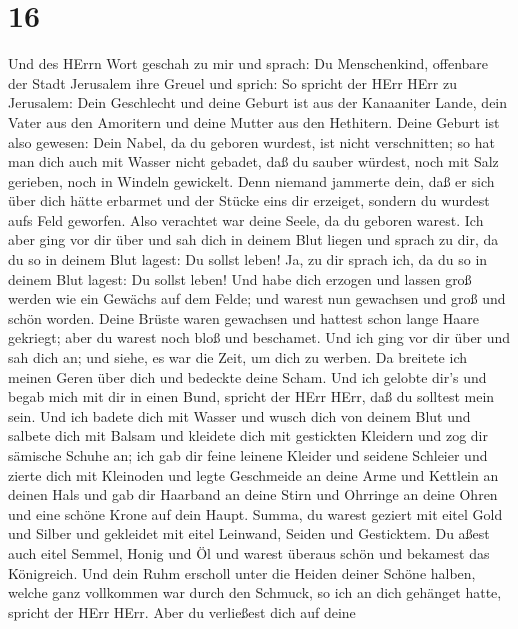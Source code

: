 \hypertarget{section-15}{%
\section{16}\label{section-15}}

 Und des HErrn Wort geschah zu mir und sprach: 
Du Menschenkind, offenbare der Stadt Jerusalem ihre Greuel und sprich:
 So spricht der HErr HErr zu Jerusalem: Dein Geschlecht und
deine Geburt ist aus der Kanaaniter Lande, dein Vater aus den Amoritern
und deine Mutter aus den Hethitern.  Deine Geburt ist also
gewesen: Dein Nabel, da du geboren wurdest, ist nicht verschnitten; so
hat man dich auch mit Wasser nicht gebadet, daß du sauber würdest, noch
mit Salz gerieben, noch in Windeln gewickelt.  Denn niemand
jammerte dein, daß er sich über dich hätte erbarmet und der Stücke eins
dir erzeiget, sondern du wurdest aufs Feld geworfen. Also verachtet war
deine Seele, da du geboren warest.  Ich aber ging vor dir
über und sah dich in deinem Blut liegen und sprach zu dir, da du so in
deinem Blut lagest: Du sollst leben! Ja, zu dir sprach ich, da du so in
deinem Blut lagest: Du sollst leben!  Und habe dich erzogen
und lassen groß werden wie ein Gewächs auf dem Felde; und warest nun
gewachsen und groß und schön worden. Deine Brüste waren gewachsen und
hattest schon lange Haare gekriegt; aber du warest noch bloß und
beschamet.  Und ich ging vor dir über und sah dich an; und
siehe, es war die Zeit, um dich zu werben. Da breitete ich meinen Geren
über dich und bedeckte deine Scham. Und ich gelobte dir's und begab mich
mit dir in einen Bund, spricht der HErr HErr, daß du solltest mein sein.
 Und ich badete dich mit Wasser und wusch dich von deinem
Blut und salbete dich mit Balsam  und kleidete dich mit
gestickten Kleidern und zog dir sämische Schuhe an; ich gab dir feine
leinene Kleider und seidene Schleier  und zierte dich mit
Kleinoden und legte Geschmeide an deine Arme und Kettlein an deinen Hals
 und gab dir Haarband an deine Stirn und Ohrringe an deine
Ohren und eine schöne Krone auf dein Haupt.  Summa, du
warest geziert mit eitel Gold und Silber und gekleidet mit eitel
Leinwand, Seiden und Gesticktem. Du aßest auch eitel Semmel, Honig und
Öl und warest überaus schön und bekamest das Königreich. 
Und dein Ruhm erscholl unter die Heiden deiner Schöne halben, welche
ganz vollkommen war durch den Schmuck, so ich an dich gehänget hatte,
spricht der HErr HErr.  Aber du verließest dich auf deine
